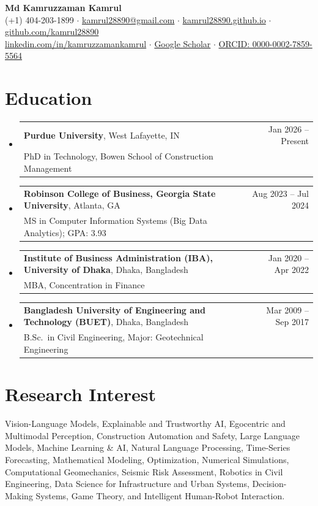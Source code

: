 \documentclass[letterpaper,10pt]{article}
\makeatletter
\newcommand{\resumeEdu}[4]{
  \vspace{-2pt}\item
    \begin{tabular*}{\textwidth}[t]{l@{\extracolsep{\fill}}r}
      \textbf{#1}, #2 & #3 \\
      \small #4 & \\
    \end{tabular*}\vspace{-7pt}
}
\newcommand{\resumeSubHeadingListStart}{\begin{itemize}[leftmargin=0in, label={}]}
\newcommand{\resumeSubHeadingListEnd}{\end{itemize}}
\makeatother
\begin{document}
\begin{center}
  {\Large \textbf{Md Kamruzzaman Kamrul}} \\ \vspace{2pt}
  \small (+1) 404-203-1899 $\cdot$
  \href{mailto:kamrul28890@gmail.com}{kamrul28890@gmail.com} $\cdot$
  \href{https://kamrul28890.github.io}{kamrul28890.github.io} $\cdot$
  \href{https://github.com/kamrul28890}{github.com/kamrul28890} \\
  \href{https://www.linkedin.com/in/kamruzzamankamrul/}{linkedin.com/in/kamruzzamankamrul} $\cdot$
  \href{https://scholar.google.com/citations?user=uc6urzoAAAAJ}{Google Scholar} $\cdot$
  \href{https://orcid.org/0000-0002-7859-5564}{ORCID: 0000-0002-7859-5564}
\end{center}

\section{Education}
\resumeSubHeadingListStart
  \resumeEdu{Purdue University}{West Lafayette, IN}{Jan 2026 -- Present}
    {PhD in Technology, Bowen School of Construction Management}
  \resumeEdu{Robinson College of Business, Georgia State University}{Atlanta, GA}{Aug 2023 -- Jul 2024}
    {MS in Computer Information Systems (Big Data Analytics); GPA: 3.93}
  \resumeEdu{Institute of Business Administration (IBA), University of Dhaka}{Dhaka, Bangladesh}{Jan 2020 -- Apr 2022}
    {MBA, Concentration in Finance}
  \resumeEdu{Bangladesh University of Engineering and Technology (BUET)}{Dhaka, Bangladesh}{Mar 2009 -- Sep 2017}
    {B.Sc.\ in Civil Engineering, Major: Geotechnical Engineering}
\resumeSubHeadingListEnd

\section{Research Interest}
\small{Vision-Language Models, Explainable and Trustworthy AI, Egocentric and Multimodal Perception, Construction Automation and Safety,
Large Language Models, Machine Learning \& AI, Natural Language Processing, Time-Series Forecasting, Mathematical Modeling, Optimization,
Numerical Simulations, Computational Geomechanics, Seismic Risk Assessment, Robotics in Civil Engineering, Data Science for
Infrastructure and Urban Systems, Decision-Making Systems, Game Theory, and Intelligent Human-Robot Interaction.}
\end{document}
